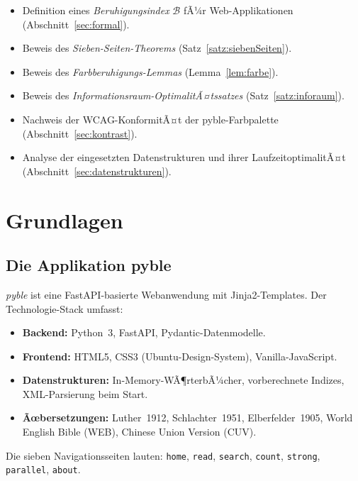 ﻿\documentclass[a4paper,12pt]{article}
\theoremstyle{definition}
\begin{document}
\begin{itemize}
    \item Definition eines \emph{Beruhigungsindex} $\mathcal{B}$ fÃ¼r
          Web-Applikationen (Abschnitt~\ref{sec:formal}).
    \item Beweis des \emph{Sieben-Seiten-Theorems} (Satz~\ref{satz:siebenSeiten}).
    \item Beweis des \emph{Farbberuhigungs-Lemmas} (Lemma~\ref{lem:farbe}).
    \item Beweis des \emph{Informationsraum-OptimalitÃ¤tssatzes}
          (Satz~\ref{satz:inforaum}).
    \item Nachweis der WCAG-KonformitÃ¤t der pyble-Farbpalette
          (Abschnitt~\ref{sec:kontrast}).
    \item Analyse der eingesetzten Datenstrukturen und ihrer LaufzeitoptimalitÃ¤t
          (Abschnitt~\ref{sec:datenstrukturen}).
\end{itemize}

\section{Grundlagen}

\subsection{Die Applikation pyble}

\textit{pyble} ist eine FastAPI-basierte Webanwendung mit Jinja2-Templates. Der
Technologie-Stack umfasst:

\begin{itemize}
    \item \textbf{Backend:} Python~3, FastAPI, Pydantic-Datenmodelle.
    \item \textbf{Frontend:} HTML5, CSS3 (Ubuntu-Design-System), Vanilla-JavaScript.
    \item \textbf{Datenstrukturen:} In-Memory-WÃ¶rterbÃ¼cher, vorberechnete Indizes,
          XML-Parsierung beim Start.
    \item \textbf{Ãœbersetzungen:} Luther~1912, Schlachter~1951, Elberfelder~1905,
          World English Bible (WEB), Chinese Union Version (CUV).
\end{itemize}

Die sieben Navigationsseiten lauten: \texttt{home}, \texttt{read}, \texttt{search},
\texttt{count}, \texttt{strong}, \texttt{parallel}, \texttt{about}.
\end{document}
